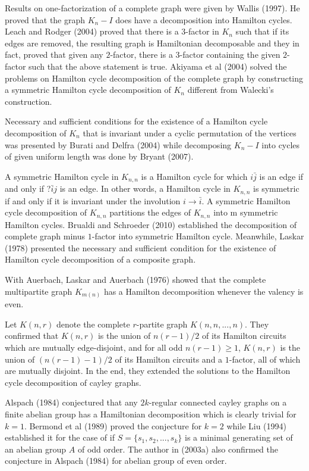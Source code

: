 \documentclass[12pt]{report}
\begin{document}
 Results  on one-factorization  of a complete graph were given by  Wallis (1997). He proved that the graph $K_n-I$ does
have a decomposition into Hamilton cycles. Leach and Rodger (2004) %
 proved that there is a
3-factor in $K_n$ such that if its edges are removed, the resulting
graph is Hamiltonian decomposable and they in fact, proved that
given any $2$-factor, there is a 3-factor containing the given
$2$-factor such that the above statement is true.  Akiyama  et al (2004) %
 solved the problems on Hamilton cycle
decomposition of the complete graph by constructing a  symmetric
Hamilton cycle decomposition of $K_n$ different from Walecki's
construction.

Necessary and sufficient conditions  for the existence of a Hamilton
cycle decomposition of $K_n$ that is invariant under a cyclic
permutation of the vertices was presented by Burati and Delfra
(2004) while decomposing $K_n-I$ into cycles of given uniform length
was done by Bryant (2007).

A symmetric Hamilton cycle in $K_{n,n}$ is a Hamilton cycle for
which $i\bar j$ is an edge if and only if ?$\bar i j$ is an edge. In
other words, a Hamilton cycle in $K_{n,n}$ is symmetric if and only
if it is invariant under the involution $i\longrightarrow \bar i$. A
symmetric Hamilton cycle decomposition of $K_{n,n}$ partitions the
edges of $K_{n,n}$ into m symmetric Hamilton cycles.
Brualdi and Schroeder (2010) %
 established the
decomposition of complete graph minus $1$-factor into symmetric
Hamilton cycle. Meanwhile, Laskar (1978) %
presented the necessary and sufficient condition for the existence
of Hamilton cycle decomposition of a composite graph.

With Auerbach, Laskar and Auerbach (1976) %
showed that the complete multipartite graph $K_{m(n)}$ has a
Hamilton decomposition whenever the valency is even.


 Let $K(n,r)$
denote the complete $r$-partite graph $K(n,n,...,n)$. They confirmed
that $K(n,r)$ is the union of $n(r-1)/2$ of its Hamilton circuits
which are mutually edge-disjoint, and for all odd $n(r-1)\geq 1$,
$K(n,r)$ is the union of $(n(r-1)-1)/2$ of its Hamilton circuits and
a $1$-factor, all of which are mutually disjoint. In the end, they
extended the solutions to the Hamilton cycle decomposition of cayley
graphs.

 Alspach (1984) %
 conjectured that any $2k$-regular connected  cayley graphs on a finite abelian group has a Hamiltonian decomposition which is clearly trivial for $k=1$. Bermond  et al (1989) %
 proved the conjecture for $k=2$
 while Liu (1994) %
  established it  for the case of if $S=\{s_1,s_2,...,s_k\}$ is a minimal generating set of an abelian group $A$ of odd order. The author in (2003a) %
 also confirmed the conjecture in Alspach (1984) %
for abelian group of even order.
\end{document}
